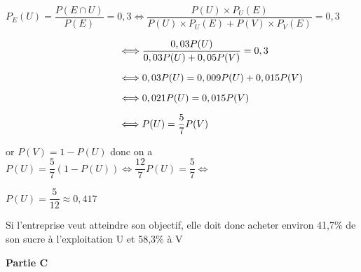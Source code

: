 \documentclass[11pt,a4paper,answers,fancyhdr]{exam}
\newcommand{\equi}{\Longleftrightarrow}
\newcommand{\x}{\times}
\begin{document}
\begin{enumerate}
\begin{solution}
$P_E(U)=\dfrac{P(E\cap U)}{P(E)}=0,3 \equi \dfrac{P(U)\x P_U(E)}{P(U)\x P_U(E) +P(V)\x P_V(E)}=0,3$

$\hphantom{P_E(U)=\dfrac{P(E\cap U)}{P(E)}=0,3} \equi \dfrac{0,03P(U)}{0,03P(U) +0,05P(V)}=0,3$

$\hphantom{P_E(U)=\dfrac{P(E\cap U)}{P(E)}=0,3} \equi 0,03P(U)=0,009P(U) +0,015P(V)$

$\hphantom{P_E(U)=\dfrac{P(E\cap U)}{P(E)}=0,3} \equi 0,021P(U)=0,015P(V)$

$\hphantom{P_E(U)=\dfrac{P(E\cap U)}{P(E)}=0,3} \equi P(U)=\dfrac{5}{7}P(V)$

or $P(V)=1-P(U)$ donc on a $P(U)=\dfrac{5}{7}\left( 1-P(U)\right) \equi \dfrac{12}{7}P(U)=\dfrac{5}{7} \equi$

$P(U)=\dfrac{5}{12}\approx 0,417 $

Si l'entreprise veut atteindre son objectif, elle doit donc acheter environ 41,7\% de son sucre à l'exploitation U et 58,3\% à V
\end{solution}
\end{enumerate}

\bigskip

\textbf{Partie C}

\medskip
\end{document}
